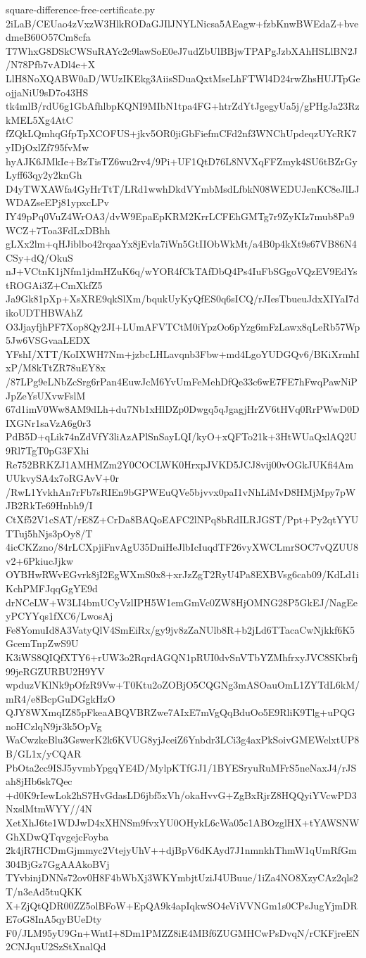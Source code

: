 \documentclass[11pt]{article}
\theoremstyle{definition}
\theoremstyle{remark}
\begin{document}
\begin{filecontents*}[overwrite]{square-difference-free-certificate.py}
2iLaB/CEUao4zVxzW3HlkRODaGJIlJNYLNicsa5AEagw+fzbKnwBWEdaZ+bvedmeB60O57Cm8cfa
T7WhxG8DSkCWSuRAYc2c9lawSoE0eJ7udZbUlBBjwTPAPgJzbXAhHSLlBN2J/N78Pfb7vADl4e+X
LlH8NoXQABW0aD/WUzIKEkg3AiisSDuaQxtMseLhFTWl4D24rwZhsHUJTpGeojjaNiU9sD7o43HS
tk4mlB/rdU6g1GbAfhlbpKQNI9MIbN1tpa4FG+htrZdYtJgegyUa5j/gPHgJa23RzkMEL5Xg4AtC
fZQkLQmhqGfpTpXCOFUS+jkv5OR0jiGbFiefmCFd2nf3WNChUpdeqzUYcRK7yIDjOxlZf795fvMw
hyAJK6JMkIe+BzTisTZ6wu2rv4/9Pi+UF1QtD76L8NVXqFFZmyk4SU6tBZrGyLyff63qy2y2knGh
D4yTWXAWfa4GyHrTtT/LRd1wwhDkdVYmbMsdLfbkN08WEDUJenKC8eJlLJWDAZseEPj81ypxcLPv
IY49pPq0VuZ4WrOA3/dvW9EpaEpKRM2KrrLCFEhGMTg7r9ZyKIz7mub8Pa9WCZ+7Toa3FdLxDBhh
gLXx2lm+qHJiblbo42rqaaYx8jEvla7iWn5GtIIObWkMt/a4B0p4kXt9s67VB86N4CSy+dQ/OkuS
nJ+VCtnK1jNfm1jdmHZuK6q/wYOR4fCkTAfDbQ4Ps4IuFbSGgoVQzEV9EdYstROGAi3Z+CmXkfZ5
Ja9Gk81pXp+XsXRE9qkSlXm/bqukUyKyQfES0q6sICQ/rJIesTbueuJdxXIYaI7dikoUDTHBWAhZ
O3JjayfjhPF7Xop8Qy2JI+LUmAFVTCtM0iYpzOo6pYzg6mFzLawx8qLeRb57Wp5Jw6VSGvaaLEDX
YFshI/XTT/KoIXWH7Nm+jzbcLHLavqnb3Fbw+md4LgoYUDGQv6/BKiXrmhIxP/M8kTtZR78uEY8x
/87LPg9eLNbZcSrg6rPan4EuwJcM6YvUmFeMehDfQe33c6wE7FE7hFwqPawNiPJpZeYsUXvwFslM
67d1imV0Ww8AM9dLh+du7Nb1xHlDZp0Dwgq5qJgagjHrZV6tHVq0RrPWwD0DIXGNr1saVzA6g0r3
PdB5D+qLik74nZdVfY3liAzAPlSnSayLQI/kyO+xQFTo21k+3HtWUaQxlAQ2U9Rl7TgT0pG3FXhi
Re752BRKZJ1AMHMZm2Y0COCLWK0HrxpJVKD5JCJ8vij00vOGkJUKfi4AmUUkvySA4x7oRGAvV+0r
/RwL1YvkhAn7rFb7sRIEn9bGPWEuQVe5bjvvx0paI1vNhLiMvD8HMjMpy7pWJB2RkTe69Hnbh9/I
CtXf52V1cSAT/rE8Z+CrDa8BAQoEAFC2lNPq8bRdILRJGST/Ppt+Py2qtYYUTTuj5hNjs3pOy8/T
4icCKZzno/84rLCXpjiFnvAgU35DniHeJlbIcIuqdTF26vyXWCLmrSOC7vQZUU8v2+6PkiucJjkw
OYBHwRWvEGvrk8jI2EgWXmS0x8+xrJzZgT2RyU4Pa8EXBVsg6cab09/KdLd1iKchPMFJqqGgYE9d
drNCeLW+W3LI4bmUCyVzlIPH5W1emGmVc0ZW8HjOMNG28P5GkEJ/NagEeyPCYYqs1fXC6/LwosAj
Fe8YomuId8A3VatyQlV4SmEiRx/gy9jv8zZaNUlb8R+b2jLd6TTacaCwNjkkf6K5GcemTnpZwS9U
K3iWS8QIQfXTY6+rUW3o2RqrdAGQN1pRUI0dvSnVTbYZMhfrxyJVC8SKbrfj99jeRGZURBU2H9YV
wpduzVKlNk9pOfzR9Vw+T0Ktu2oZOBjO5CQGNg3mASOauOmL1ZYTdL6kM/mR4/e8BcpGuDGgkHzO
QJY8WXmqIZ85pFkeaABQVBRZwe7AIxE7mVgQqBduOo5E9RliK9Tlg+uPQGnoHCzlqN9jr3k5OpVg
WaCwzkeBlu3GswerK2k6KVUG8yjJceiZ6Ynbdr3LCi3g4axPkSoivGMEWelxtUP8B/GL1x/yCQAR
PbOta2cc9ISJ5yvmbYpgqYE4D/MylpKTfGJ1/1BYESryuRuMFrS5neNaxJ4/rJSah8jHb6sk7Qec
+d0K9rIewLok2hS7HvGdasLD6jbf5xVh/okaHvvG+ZgBxRjrZ8HQQyiYVcwPD3NxslMtmWYY//4N
XetXhJ6te1WDJwD4xXHNSm9fvxYU0OHykL6cWa05c1ABOzglHX+tYAWSNWGhXDwQTqvgejcFoyba
2k4jR7HCDmGjmmyc2VtejyUhV++djBpV6dKAyd7J1nmnkhThmW1qUmRfGm304BjGz7GgAAAkoBVj
TYvbinjDNNs72ov0H8F4bWbXj3WKYmbjtUziJ4UBuue/1iZa4NO8XzyCAz2qls2T/n3eAd5tuQKK
X+ZjQtQDR00ZZ5olBFoW+EpQA9k4apIqkwSO4eViVVNGm1s0CPsJugYjmDRE7oG8InA5qyBUeDty
F0/JLM95yU9Gn+WntI+8Dm1PMZZ8iE4MBf6ZUGMHCwPsDvqN/rCKFjreEN2CNJquU2SzStXnalQd

\end{filecontents*}
\end{document}
